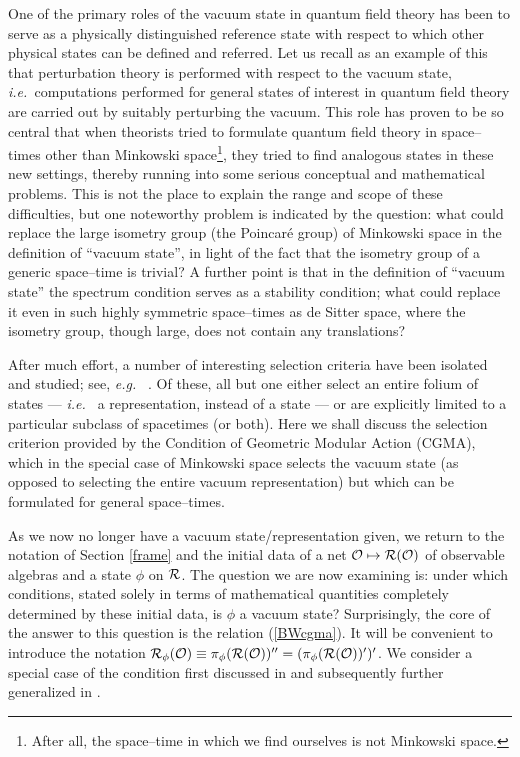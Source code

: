 \documentclass[12pt]{article}
\newcommand{\ie}{{\it i.e.\ }}
\newcommand{\eg}{{\it e.g.\ }}
\def\Os{{\cal O}}
\def\Rs{{\cal R}}
\begin{document}
     One of the primary roles of the vacuum state in quantum field
theory has been to serve as a physically distinguished reference state
with respect to which other physical states can be defined and
referred. Let us recall as an example of this that perturbation theory
is performed with respect to the vacuum state, \ie computations
performed for general states of interest in quantum field theory are
carried out by suitably perturbing the vacuum. This role has proven to
be so central that when theorists tried to formulate quantum field
theory in space--times other than Minkowski space\footnote{After all,
the space--time in which we find ourselves is not Minkowski space.},
they tried to find analogous states in these new settings, thereby
running into some serious conceptual and mathematical problems.  This
is not the place to explain the range and scope of these difficulties,
but one noteworthy problem is indicated by the question: what could
replace the large isometry group (the Poincar\'e group) of Minkowski
space in the definition of ``vacuum state'', in light of the fact that
the isometry group of a generic space--time is trivial? A further
point is that in the definition of ``vacuum state'' the spectrum
condition serves as a stability condition; what could replace it even
in such highly symmetric space--times as de Sitter space, where the
isometry group, though large, does not contain any translations?

     After much effort, a number of interesting selection criteria
have been isolated and studied; see, \eg
\cite{BrFrKo,BS3,BDFS,BFS1,FeVe,KaWa,LuRo,Rad,BoBu,BSads,Ku5,Str}. Of
these, all but one either select an entire folium of states --- \ie
a representation, instead of a state --- or are explicitly limited to
a particular subclass of spacetimes (or both). Here we shall discuss
the selection criterion provided by the Condition of Geometric Modular
Action (CGMA), which in the special case of Minkowski space selects the
vacuum state (as opposed to selecting the entire vacuum
representation) but which can be formulated for general space--times.

     As we now no longer have a vacuum state/representation given, we
return to the notation of Section \ref{frame} and the initial data of
a net $\Os \mapsto \Rs(\Os)$ of observable algebras and a state $\phi$
on $\Rs$. The question we are now examining is: under which
conditions, stated solely in terms of mathematical quantities
completely determined by these initial data, is $\phi$ a vacuum state?
Surprisingly, the core of the answer to this question is the 
relation (\ref{BWcgma}). It will be convenient to introduce the
notation $\Rs_\phi(\Os) \equiv \pi_\phi(\Rs(\Os))'' = (\pi_\phi(\Rs(\Os))')'$.
We consider a special case of the condition first discussed in \cite{BS1}
and subsequently further generalized in \cite{BDFS}.
\end{document}
